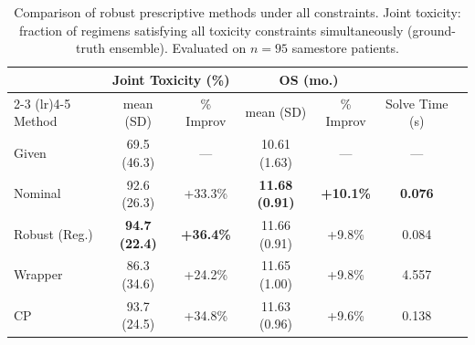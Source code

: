 \begin{table}[ht]
\centering
\caption{Comparison of robust prescriptive methods under all constraints. Joint toxicity: fraction of regimens satisfying all toxicity constraints simultaneously (ground-truth ensemble). Evaluated on $n=95$ samestore patients.}
\label{tab:chemo_all_constraints}
\begin{tabular}{lcccccc}
\toprule
& \multicolumn{2}{c}{Joint Toxicity (\%)} & \multicolumn{2}{c}{OS (mo.)} & \\
\cmidrule(lr){2-3} \cmidrule(lr){4-5}
Method & mean (SD) & \% Improv & mean (SD) & \% Improv & Solve Time (s) \\
\midrule
Given & 69.5 (46.3) & --- & 10.61 (1.63) & --- & --- \\
\midrule
Nominal & 92.6 (26.3) & +33.3\% & \textbf{11.68 (0.91)} & \textbf{+10.1\%} & \textbf{0.076} \\
Robust (Reg.) & \textbf{94.7 (22.4)} & \textbf{+36.4\%} & 11.66 (0.91) & +9.8\% & 0.084 \\
Wrapper & 86.3 (34.6) & +24.2\% & 11.65 (1.00) & +9.8\% & 4.557 \\
CP & 93.7 (24.5) & +34.8\% & 11.63 (0.96) & +9.6\% & 0.138 \\
\bottomrule
\end{tabular}
\end{table}
